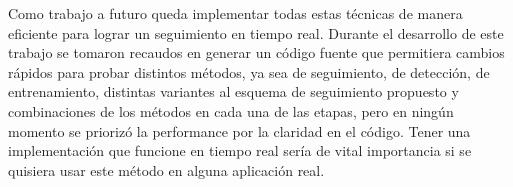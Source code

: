 Como trabajo a futuro queda implementar todas estas técnicas de manera eficiente para lograr un seguimiento en tiempo real. Durante el desarrollo de este trabajo se tomaron recaudos en generar un código fuente que permitiera cambios rápidos para probar distintos métodos, ya sea de seguimiento, de detección, de entrenamiento, distintas variantes al esquema de seguimiento propuesto y combinaciones de los métodos en cada una de las etapas, pero en ningún momento se priorizó la performance por la claridad en el código. Tener una implementación que funcione en tiempo real sería de vital importancia si se quisiera usar este método en alguna aplicación real.
